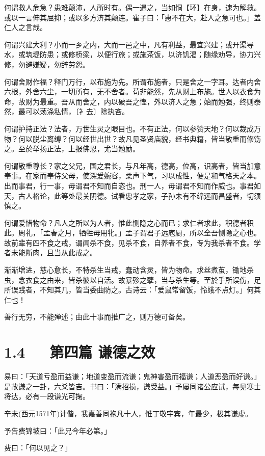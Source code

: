 \documentclass[letterpaper,10pt,english]{sphinxmanual}
\begin{document}
何谓救人危急？患难颠沛，人所时有。偶一遇之，当如恫【环】在身，速为解救。或以一言伸其屈抑；或以多方济其颠连。崔子曰：「惠不在大，赴人之急可也。」盖仁人之言哉。

何谓兴建大利？小而一乡之内，大而一邑之中，凡有利益，最宜兴建；或开渠导水，或筑堤防患；或修桥梁，以便行旅；或施茶饭，以济饥渴；随缘劝导，协力兴修，勿避嫌疑，勿辞劳怨。

何谓舍财作福？释门万行，以布施为先。所谓布施者，只是舍之一字耳。达者内舍六根，外舍六尘，一切所有，无不舍者。苟非能然，先从财上布施。世人以衣食为命，故财为最重。吾从而舍之，内以破吾之悭，外以济人之急；始而勉强，终则泰然，最可以荡涤私情，〔衤去〕除执吝。

何谓护持正法？法者，万世生灵之眼目也。不有正法，何以参赞天地？何以裁成万物？何以脱尘离缚？何以经世出世？故凡见圣贤庙貌，经书典籍，皆当敬重而修饬之。至於举扬正法，上报佛恩，尤当勉励。

何谓敬重尊长？家之父兄，国之君长，与凡年高，德高，位高，识高者，皆当加意奉事。在家而奉侍父母，使深爱婉容，柔声下气，习以成性，便是和气格天之本。出而事君，行一事，毋谓君不知而自恣也。刑一人，毋谓君不知而作威也。事君如天，古人格论，此等处最关阴德。试看忠孝之家，子孙未有不绵远而昌盛者，切须慎之。

何谓爱惜物命？凡人之所以为人者，惟此恻隐之心而已；求仁者求此，积德者积此。周礼，「孟春之月，牺牲毋用牝。」孟子谓君子远庖厨，所以全吾恻隐之心也。故前辈有四不食之戒，谓闻杀不食，见杀不食，自养者不食，专为我杀者不食。学者未能断肉，且当从此戒之。

渐渐增进，慈心愈长，不特杀生当戒，蠢动含灵，皆为物命。求丝煮茧，锄地杀虫，念衣食之由来，皆杀彼以自活。故暴殄之孽，当与杀生等。至於手所误伤，足所误践者，不知其几，皆当委曲防之。古诗云：「爱鼠常留饭，怜蛾不点灯。」何其仁也！

善行无穷，不能殚述；由此十事而推广之，则万德可备矣。


\section{1.4   第四篇 谦德之效}
\label{\detokenize{p00_u5176_u5b83/_u8881_u4e86_u51e1-_u4e86_u51e1_u56db_u8bad:id6}}
易曰：「天道亏盈而益谦；地道变盈而流谦；鬼神害盈而福谦；人道恶盈而好谦。」是故谦之一卦，六爻皆吉。书曰：「满招损，谦受益。」予屡同诸公应试，每见寒士将达，必有一段谦光可掬。

辛未(西元1571年)计偕，我嘉善同袍凡十人，惟丁敬宇宾，年最少，极其谦虚。

予告费锦坡曰：「此兄今年必第。」

费曰：「何以见之？」
\end{document}
